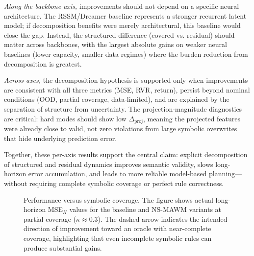 \documentclass{article}
\theoremstyle{plain}
\theoremstyle{definition}
\theoremstyle{remark}
\begin{document}
\emph{Along the backbone axis,} improvements should not depend on a specific neural architecture. The RSSM/Dreamer baseline represents a stronger recurrent latent model; if decomposition benefits were merely architectural, this baseline would close the gap. Instead, the structured difference (covered vs. residual) should matter across backbones, with the largest absolute gains on weaker neural baselines (lower capacity, smaller data regimes) where the burden reduction from decomposition is greatest.

\emph{Across axes,} the decomposition hypothesis is supported only when improvements are consistent with all three metrics (MSE, RVR, return), persist beyond nominal conditions (OOD, partial coverage, data-limited), and are explained by the separation of structure from uncertainty. The projection-magnitude diagnostics are critical: hard modes should show low $\Delta_{\text{proj}}$, meaning the projected features were already close to valid, not zero violations from large symbolic overwrites that hide underlying prediction error.

Together, these per-axis results support the central claim: explicit decomposition of structured and residual dynamics improves semantic validity, slows long-horizon error accumulation, and leads to more reliable model-based planning---without requiring complete symbolic coverage or perfect rule correctness.

\begin{figure}[t]
  \centering
  \caption{Performance versus symbolic coverage. The figure shows actual long-horizon MSE$_H$ values for the baseline and NS-MAWM variants at partial coverage ($\kappa \approx 0.3$). The dashed arrow indicates the intended direction of improvement toward an oracle with near-complete coverage, highlighting that even incomplete symbolic rules can produce substantial gains.}
  \label{fig:coverage_axes_summary}
\end{figure}
\end{document}
